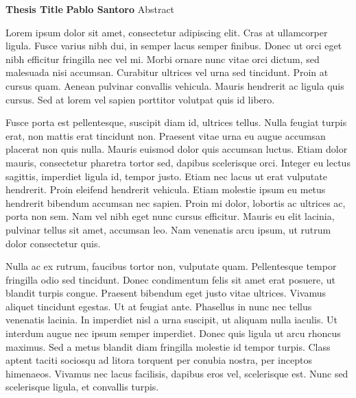 \thispagestyle{plain}
\begin{center}
    \large
    \textbf{Thesis Title}
    \vspace{0.4 cm}
    \textbf{Pablo Santoro}
    \vspace{0.4 cm}
    Abstract
\end{center}
Lorem ipsum dolor sit amet, consectetur adipiscing elit. Cras at ullamcorper ligula. Fusce varius nibh dui, in semper lacus semper finibus. Donec ut orci eget nibh efficitur fringilla nec vel mi. Morbi ornare nunc vitae orci dictum, sed malesuada nisi accumsan. Curabitur ultrices vel urna sed tincidunt. Proin at cursus quam. Aenean pulvinar convallis vehicula. Mauris hendrerit ac ligula quis cursus. Sed at lorem vel sapien porttitor volutpat quis id libero.

Fusce porta est pellentesque, suscipit diam id, ultrices tellus. Nulla feugiat turpis erat, non mattis erat tincidunt non. Praesent vitae urna eu augue accumsan placerat non quis nulla. Mauris euismod dolor quis accumsan luctus. Etiam dolor mauris, consectetur pharetra tortor sed, dapibus scelerisque orci. Integer eu lectus sagittis, imperdiet ligula id, tempor justo. Etiam nec lacus ut erat vulputate hendrerit. Proin eleifend hendrerit vehicula. Etiam molestie ipsum eu metus hendrerit bibendum accumsan nec sapien. Proin mi dolor, lobortis ac ultrices ac, porta non sem. Nam vel nibh eget nunc cursus efficitur. Mauris eu elit lacinia, pulvinar tellus sit amet, accumsan leo. Nam venenatis arcu ipsum, ut rutrum dolor consectetur quis.

Nulla ac ex rutrum, faucibus tortor non, vulputate quam. Pellentesque tempor fringilla odio sed tincidunt. Donec condimentum felis sit amet erat posuere, ut blandit turpis congue. Praesent bibendum eget justo vitae ultrices. Vivamus aliquet tincidunt egestas. Ut at feugiat ante. Phasellus in nunc nec tellus venenatis lacinia. In imperdiet nisl a urna suscipit, ut aliquam nulla iaculis. Ut interdum augue nec ipsum semper imperdiet. Donec quis ligula ut arcu rhoncus maximus. Sed a metus blandit diam fringilla molestie id tempor turpis. Class aptent taciti sociosqu ad litora torquent per conubia nostra, per inceptos himenaeos. Vivamus nec lacus facilisis, dapibus eros vel, scelerisque est. Nunc sed scelerisque ligula, et convallis turpis.

\newpage